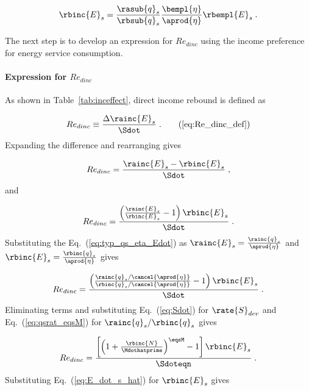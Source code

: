 \begin{equation} \label{eq:E_dot_s_hat}
  \rbinc{E}_s = \frac{\rasub{q}_s}{\rbsub{q}_s}
                \frac{\bempl{\eta}}{\aprod{\eta}}
                \rbempl{E}_s \; .
\end{equation}

The next step is to develop an expression for $Re_{dinc}$
using the income preference for energy service consumption.


\paragraph{Expression for $Re_{dinc}$}
\label{sec:Re_dinc}

As shown in Table~\ref{tab:inceffect}, direct income rebound is defined as

\begin{equation}
  Re_{dinc} \equiv \frac{\Delta \rainc{E}_s}{\Sdot} \; . \tag{\ref{eq:Re_dinc_def}}
\end{equation}
%
Expanding the difference and rearranging gives

\begin{equation}
  Re_{dinc} = \frac{\rainc{E}_s - \rbinc{E}_s}{\Sdot} \; , 
\end{equation}
%
and

\begin{equation}
  Re_{dinc} = \frac{\left( \frac{\rainc{E}_s}{\rbinc{E}_s} - 1  \right) \rbinc{E}_s}{\Sdot} \; .
\end{equation}
%
Substituting the Eq.~(\ref{eq:typ_qs_eta_Edot}) as
$\rainc{E}_s = \frac{\rainc{q}_s}{\aprod{\eta}}$ and  
$\rbinc{E}_s = \frac{\rbinc{q}_s}{\aprod{\eta}}$ gives

\begin{equation}
  Re_{dinc} = \frac{\left( \frac{\rainc{q}_s / \cancel{\aprod{\eta}}}{\rbinc{q}_s / \cancel{\aprod{\eta}}} - 1  \right) \rbinc{E}_s} 
              {\Sdot} \; .
\end{equation}
%
Eliminating terms and substituting Eq.~(\ref{eq:Sdot}) for $\rate{S}_{dev}$ and
Eq.~(\ref{eq:qsrat_eqsM}) for $\rainc{q}_s / \rbinc{q}_s$ gives

\begin{equation}
  Re_{dinc} = \frac{\left[ \left( 1 + \frac{\rbinc{N}}{\Mdothatprime} \right) ^{\eqsM} - 1  \right] \rbinc{E}_s} 
              {\Sdoteqn} \; .
\end{equation}
%
Substituting Eq.~(\ref{eq:E_dot_s_hat}) for $\rbinc{E}_s$ gives

